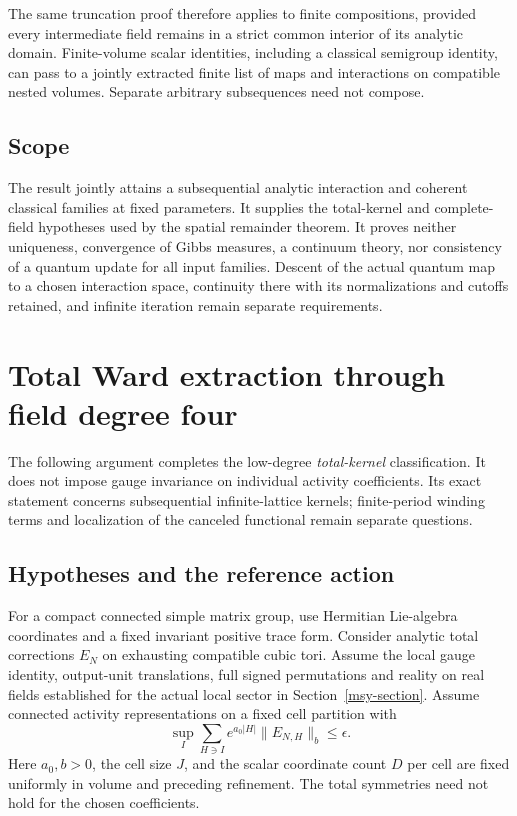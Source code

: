 \documentclass[11pt]{article}
\theoremstyle{remark}
\begin{document}
The same truncation proof therefore applies to finite
compositions, provided every intermediate field remains in
a strict common interior of its analytic domain. Finite-volume
scalar identities, including a classical semigroup identity,
can pass to a jointly extracted finite list of maps and
interactions on compatible nested volumes. Separate arbitrary
subsequences need not compose.

\subsection{Scope}
\label{aic-scope}

The result jointly attains a subsequential analytic interaction
and coherent classical families at fixed parameters. It supplies
the total-kernel and complete-field hypotheses used by the
spatial remainder theorem. It proves neither uniqueness,
convergence of Gibbs measures, a continuum theory, nor consistency
of a quantum update for all input families. Descent of the actual
quantum map to a chosen interaction space, continuity there with
its normalizations and cutoffs retained, and infinite iteration
remain separate requirements.

\section{Total Ward extraction through field degree four}
\label{tkw-section}

The following argument completes the low-degree \emph{total-kernel}
classification. It does not impose gauge invariance on individual
activity coefficients. Its exact statement concerns subsequential
infinite-lattice kernels; finite-period winding terms and localization
of the canceled functional remain separate questions.

\subsection{Hypotheses and the reference action}
\label{tkw-hypotheses}

For a compact connected simple matrix group, use Hermitian Lie-algebra
coordinates and a fixed invariant positive trace form. Consider analytic
total corrections \(E_N\) on exhausting compatible cubic tori. Assume
the local gauge identity, output-unit translations, full signed
permutations and reality on real fields established for the actual
local sector in Section~\ref{msy-section}. Assume connected activity
representations on a fixed cell partition with
\begin{equation}
 \sup_I\sum_{H\ni I}e^{a_0|H|}\|E_{N,H}\|_b\le\epsilon .
 \label{tkw-activity}
\end{equation}
Here \(a_0,b>0\), the cell size \(J\), and the scalar coordinate count
\(D\) per cell are fixed uniformly in volume and preceding refinement.
The total symmetries need not hold for the chosen coefficients.
\end{document}
